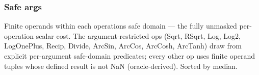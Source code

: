 \label{2812026322430809105}{}


\subsubsection{Safe args}



\label{15024080724600605730}{}


Finite operands within each operation{\textquotesingle}s safe domain — the fully unmasked per-operation scalar cost. The argument-restricted ops (Sqrt, RSqrt, Log, Log2, LogOnePlus, Recip, Divide, ArcSin, ArcCos, ArcCosh, ArcTanh) draw from explicit per-argument safe-domain predicates; every other op uses finite operand tuples whose defined result is not NaN (oracle-derived). Sorted by median.




